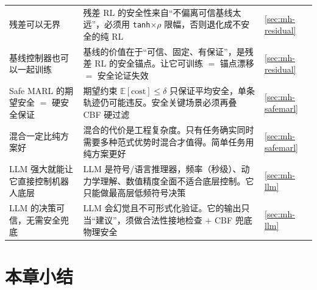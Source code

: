 \begin{table}[H]
\begin{tabular}{p{4.4cm}p{6.4cm}p{1.8cm}}
残差可以无界 & 残差 RL 的安全性来自“不偏离可信基线太远”，必须用 \texttt{tanh}$\times\rho$ 限幅，否则退化成不安全的纯 RL & \cref{sec:mh-residual} \\
基线控制器也可以一起训练 & 基线的价值在于“可信、固定、有保证”，是残差 RL 的安全锚点。让它可训练 $=$ 锚点漂移 $=$ 安全论证失效 & \cref{sec:mh-residual} \\
Safe MARL 的期望安全 $=$ 硬安全保证 & 期望约束 $\mathbb{E}[\text{cost}]\le\delta$ 只保证平均安全，单条轨迹仍可能违反。安全关键场景必须再叠 CBF 硬过滤 & \cref{sec:mh-safemarl} \\
混合一定比纯方案好 & 混合的代价是工程复杂度。只有任务确实同时需要多种范式优势时混合才值得。简单任务用纯方案更好 & \cref{sec:mh-safemarl} \\
LLM 强大就能让它直接控制机器人底层 & LLM 是符号/语言推理器，频率（秒级）、动力学理解、数值精度全面不适合底层控制。它只能做最高层低频符号决策 & \cref{sec:mh-llm} \\
LLM 的决策可信，无需安全兜底 & LLM 会幻觉且不可形式化验证。它的输出只当“建议”，须做合法性接地检查 $+$ CBF 兜底物理安全 & \cref{sec:mh-llm} \\
\bottomrule
\end{tabular}
\end{table}

\section*{本章小结}

